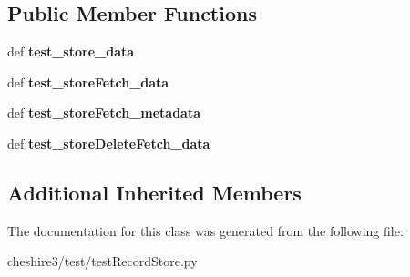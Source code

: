 \subsection*{Public Member Functions}
\begin{DoxyCompactItemize}
\item 
\hypertarget{classcheshire3_1_1test_1_1test_record_store_1_1_record_store_test_case_a797285dd44e78696e39efe088bb2078f}{def {\bfseries test\-\_\-store\-\_\-data}}\label{classcheshire3_1_1test_1_1test_record_store_1_1_record_store_test_case_a797285dd44e78696e39efe088bb2078f}

\item 
\hypertarget{classcheshire3_1_1test_1_1test_record_store_1_1_record_store_test_case_a81c921aa5efb9f0a3eff9ac2ce5de482}{def {\bfseries test\-\_\-store\-Fetch\-\_\-data}}\label{classcheshire3_1_1test_1_1test_record_store_1_1_record_store_test_case_a81c921aa5efb9f0a3eff9ac2ce5de482}

\item 
\hypertarget{classcheshire3_1_1test_1_1test_record_store_1_1_record_store_test_case_a6835f4115d93ff0708315fdceeea65fd}{def {\bfseries test\-\_\-store\-Fetch\-\_\-metadata}}\label{classcheshire3_1_1test_1_1test_record_store_1_1_record_store_test_case_a6835f4115d93ff0708315fdceeea65fd}

\item 
\hypertarget{classcheshire3_1_1test_1_1test_record_store_1_1_record_store_test_case_ab6a157301d99991c392901e170983106}{def {\bfseries test\-\_\-store\-Delete\-Fetch\-\_\-data}}\label{classcheshire3_1_1test_1_1test_record_store_1_1_record_store_test_case_ab6a157301d99991c392901e170983106}

\end{DoxyCompactItemize}
\subsection*{Additional Inherited Members}


The documentation for this class was generated from the following file\-:\begin{DoxyCompactItemize}
\item 
cheshire3/test/test\-Record\-Store.\-py\end{DoxyCompactItemize}
